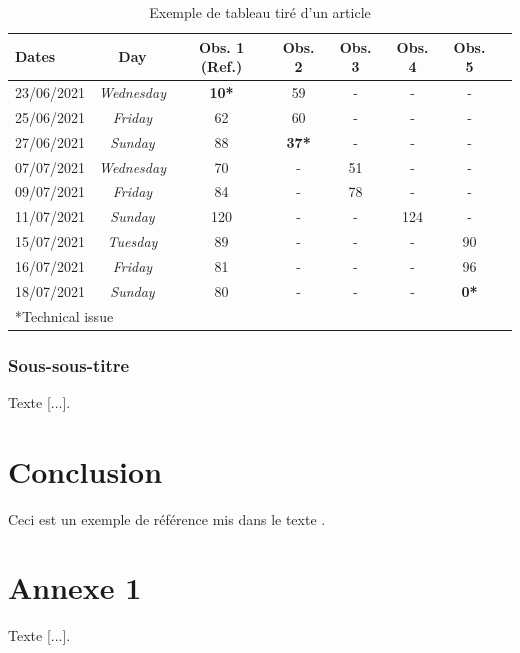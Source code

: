 \documentclass{poly}
\begin{document}
\begin{table}[!ht]
	\caption{Exemple de tableau tiré d’un article}
	\label{tab:summary}
	\begin{center}
		\begin{tabular}{l c c c c c c c}
            \toprule
			Dates & Day & Obs. 1 (Ref.) & Obs. 2 & Obs. 3 & Obs. 4 & Obs. 5 \\
            \midrule
			23/06/2021 & \textit{Wednesday} & \bf{10}* & 59 & - & - & - \\
			25/06/2021 & \textit{Friday} & 62 & 60 & - & - & - \\
			27/06/2021 & \textit{Sunday} & 88 & \bf{37}* & - & - & - \\
			07/07/2021 & \textit{Wednesday} & 70 & - & 51 & - & - \\ 
			09/07/2021 & \textit{Friday} & 84 & - & 78 & - & - \\
			11/07/2021 & \textit{Sunday} & 120 & - & - & 124 & - \\
			15/07/2021 & \textit{Tuesday} & 89 & - & - & - & 90 \\
			16/07/2021 & \textit{Friday} & 81 & - & - & -  & 96\\
			18/07/2021 & \textit{Sunday} & 80 & - & - & - & \bf{0}*\\
            \bottomrule
            \multicolumn{3}{l}{*Technical issue}\\
		\end{tabular}
	\end{center}
\end{table}

\subsubsection{Sous-sous-titre}

Texte [...].

\section{Conclusion}

Ceci est un exemple de référence mis dans le texte \cite{intdesign20discoverability}.

\newpage

\printbibliography

\newpage

\appendix

\section{Annexe 1}

Texte [...].
\end{document}
